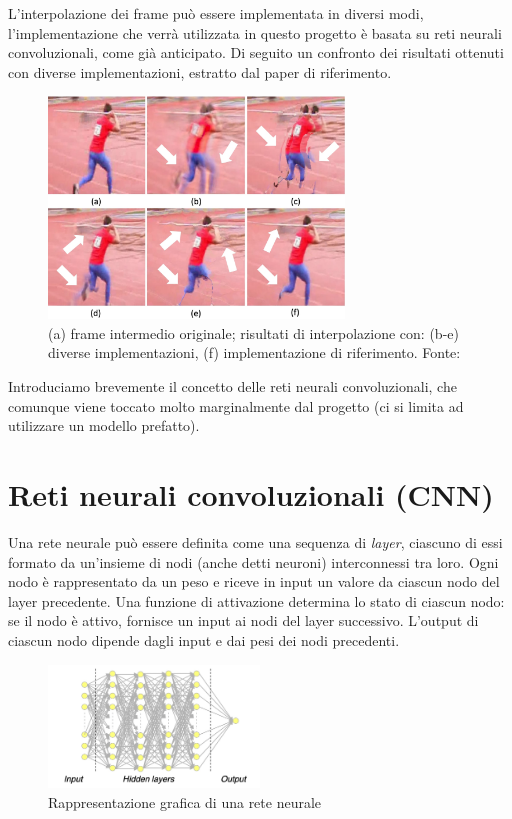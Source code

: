 L'interpolazione dei frame può essere implementata in diversi modi, l'implementazione che verrà utilizzata in questo progetto
è basata su reti neurali convoluzionali, come già anticipato. Di seguito un confronto dei risultati ottenuti con diverse
implementazioni, estratto dal paper di riferimento.

\newpage

\begin{figure}[t!]
    \includegraphics[width=0.7\textwidth]{img/confronto_interpolazione_frame.jpg}
    \centering
    \caption{(a) frame intermedio originale; risultati di interpolazione con: (b-e) diverse implementazioni, (f) implementazione
    di riferimento. Fonte: \cite{paper_superslomo}}
    \label{fig:confronto_interpolazione_frame}
\end{figure}

Introduciamo brevemente il concetto delle reti neurali convoluzionali, che comunque viene toccato molto marginalmente dal
progetto (ci si limita ad utilizzare un modello prefatto).

\section*{Reti neurali convoluzionali (CNN)}

Una rete neurale può essere definita come una sequenza di \textit{layer}, ciascuno di essi formato da un'insieme di nodi (anche
detti neuroni) interconnessi tra loro. Ogni nodo è rappresentato da un peso e riceve in input un valore da ciascun nodo del layer 
precedente. Una funzione di attivazione determina lo stato di ciascun nodo: se il nodo è attivo, fornisce un input ai nodi del
layer successivo. L'output di ciascun nodo dipende dagli input e dai pesi dei nodi precedenti.

\begin{figure}[h!]
    \includegraphics[width=0.5\textwidth]{img/rete_neurale.jpg}
    \centering
    \caption{Rappresentazione grafica di una rete neurale}
    \label{fig:rete_neurale}
\end{figure}

